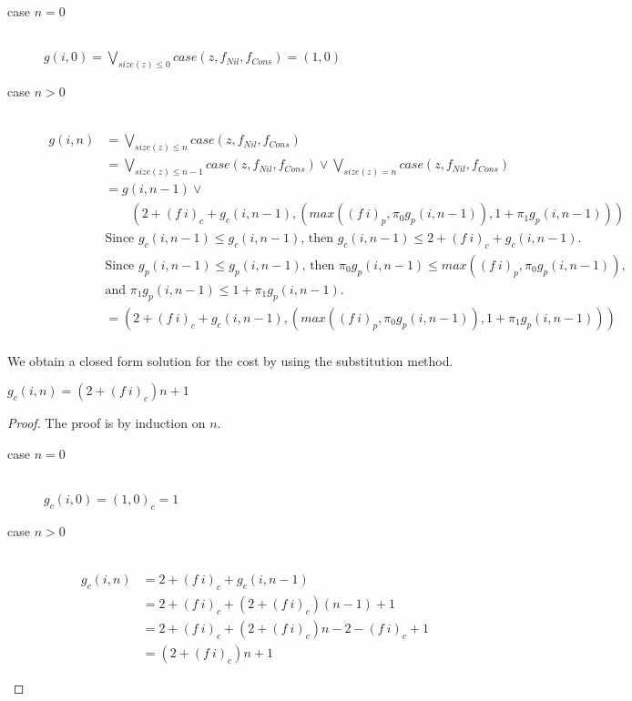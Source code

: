 \begin{description}
  \item[case $n=0$]\hfill \\
    $g(i,0) = \bigvee\limits_{size(z) \leq 0} case(z, f_{Nil}, f_{Cons}) = (1,0)$
  \item[case $n>0$]\hfill \\
    \begin{align*}
      g(i,n) &= \bigvee\limits_{size(z) \leq n} case(z, f_{Nil}, f_{Cons}) \\
             &= \bigvee\limits_{size(z) \leq n-1} case(z,f_{Nil},f_{Cons}) \vee \bigvee\limits_{size(z) = n} case(z,f_{Nil}, f_{Cons}) \\
             &= g(i,n-1) \vee \\
             &\qquad (2 + (f\ i)_c + g_c(i,n-1), (max((f\ i)_p,\pi_0g_p(i,n-1)), 1 + \pi_1 g_p(i,n-1))) \\
             &\text{Since $g_c(i,n-1) \leq g_c(i,n-1)$, then $g_c(i,n-1)\leq 2 + (f\ i)_c + g_c(i,n-1)$.} \\
             &\text{Since $g_p(i,n-1) \leq g_p(i,n-1)$, then $\pi_0 g_p(i,n-1) \leq max((f\ i)_p, \pi_0g_p(i,n-1))$,} \\
             &\text{and $\pi_1 g_p(i,n-1) \leq 1 + \pi_1 g_p(i,n-1)$.} \\
             &= (2 + (f\ i)_c + g_c(i,n-1), (max((f\ i)_p,\pi_0g_p(i,n-1)), 1 + \pi_1 g_p(i,n-1))) \\
    \end{align*}
\end{description}
%
We obtain a closed form solution for the cost by using the substitution method.
%
\begin{lemma}
  \label{lem:listmap_g_cost}
  $g_c(i,n) = (2 + (f\ i)_c) n + 1$
\end{lemma}
%
\begin{proof}
  The proof is by induction on $n$.
  \begin{description}
    \item[case $n=0$]\hfill \\
      $g_c(i,0) = (1,0)_c = 1$
    \item[case $n>0$]\hfill \\
      \begin{align*}
        g_c(i,n) &= 2 + (f\ i)_c + g_c(i,n-1)\\
                 &= 2 + (f\ i)_c + (2 + (f\ i)_c)(n-1) + 1\\
                 &= 2 + (f\ i)_c + (2 + (f\ i)_c) n - 2 - (f\ i)_c + 1\\
                 &= (2 + (f\ i)_c) n + 1
      \end{align*}
    \end{description}
\end{proof}
